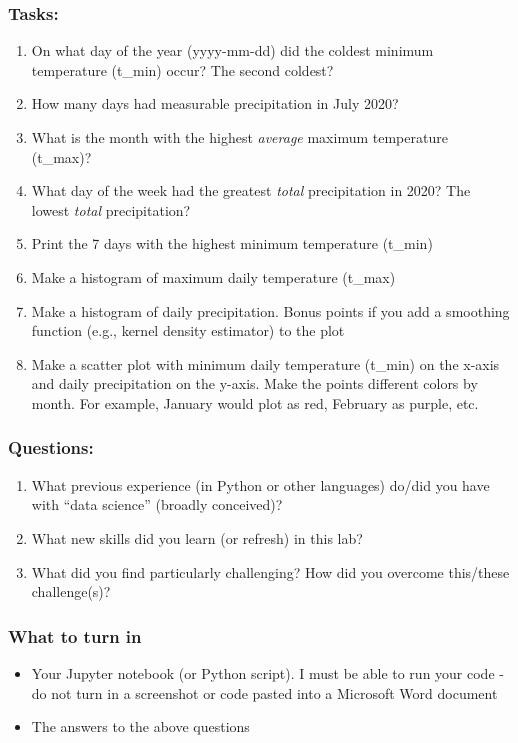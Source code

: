 \documentclass[]{article}
\begin{document}
\hypertarget{tasks}{%
\subsubsection{Tasks:}\label{tasks}}

\begin{enumerate}
\def\labelenumi{\arabic{enumi}.}
\item
  On what day of the year (yyyy-mm-dd) did the coldest minimum
  temperature (t\_min) occur? The second coldest?
\item
  How many days had measurable precipitation in July 2020?
\item
  What is the month with the highest \emph{average} maximum temperature
  (t\_max)?
\item
  What day of the week had the greatest \emph{total} precipitation in
  2020? The lowest \emph{total} precipitation?
\item
  Print the 7 days with the highest minimum temperature (t\_min)
\item
  Make a histogram of maximum daily temperature (t\_max)
\item
  Make a histogram of daily precipitation. Bonus points if you add a
  smoothing function (e.g., kernel density estimator) to the plot
\item
  Make a scatter plot with minimum daily temperature (t\_min) on the
  x-axis and daily precipitation on the y-axis. Make the points
  different colors by month. For example, January would plot as red,
  February as purple, etc.
\end{enumerate}

\hypertarget{questions}{%
\subsubsection{Questions:}\label{questions}}

\begin{enumerate}
\def\labelenumi{\arabic{enumi}.}
\item
  What previous experience (in Python or other languages) do/did you
  have with ``data science'' (broadly conceived)?
\item
  What new skills did you learn (or refresh) in this lab?
\item
  What did you find particularly challenging? How did you overcome
  this/these challenge(s)?
\end{enumerate}

\hypertarget{what-to-turn-in}{%
\subsubsection{What to turn in}\label{what-to-turn-in}}

\begin{itemize}
\item
  Your Jupyter notebook (or Python script). I must be able to run your
  code - do not turn in a screenshot or code pasted into a Microsoft
  Word document
\item
  The answers to the above questions
\end{itemize}
\end{document}
